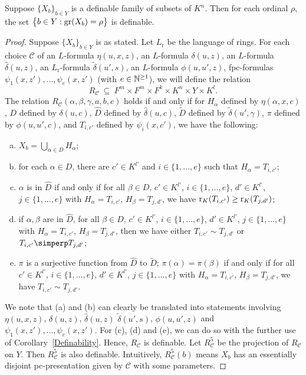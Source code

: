 \begin{thm}
Suppose $ \{ X_b\}_{b \in Y}$ is a definable family of subsets of $K^n$. Then for each ordinal \(\rho\), the set \( \big\{ b \in Y :  \mathrm{gr}(X_b)= \rho\big\} \) is definable.
\end{thm}

\begin{proof}
Suppose $ \{ X_b\}_{b \in Y}$ is as stated. Let $L_{\mathrm{r}}$ be the language of rings. For each choice $\mathscr{C}$ of an $L$-formula $\eta(u,x,z)$, an $L$-formula $\delta(u,z)$, an $L$-formula $\hat{\delta}(u,z)$,   an $L_{\mathrm{r}}$-formula $\tilde{\delta}(u',s)$,  an $L$-formula $\phi(u,u',z)$, fpc-formulas $\psi_1(x,z'), \ldots, \psi_e(x,z')$ (with $e \in \mathbb{N}^{\geq 1}$), we will define the relation 
$$R_{\mathscr{C}}\ \subseteq\ F^{m} \times  F^{m}\times F^{k} \times K^n \times Y \times K^{l} .$$
The relation $R_{\mathscr{C}}(\alpha, \beta, \gamma, a, b, c)$ holds if and only if for  $H_\alpha$ defined by $\eta(\alpha,x,c)$, $D$ defined by ${\delta}(u,c)$, $\hat{D}$ defined by $\hat{\delta}(u,c)$,  $\widetilde{D}$ defined by $\tilde{\delta}(u',\gamma)$, $\pi$ defined by $\phi(u,u',c)$, and  $T_{i,c'}$ defined by $\psi_i( x,c')$, we have the following:
\begin{enumerate}[(a)]
\item $X_b =\bigcup_{\alpha \in D} H_\alpha$;
\item for each  $\alpha \in D$,  there are $c' \in K^{l'}$ and $i \in \{1, \ldots, e \} $ such that $H_\alpha = T_{i,c'}$;
\item $\alpha$ is in $\hat{D}$ if and only if for all $\beta \in D$,  $c' \in K^{l'}$, $i \in \{1, \ldots, e \} $, $d' \in K^{l'}$, $j \in \{1, \ldots, e\} $ with  $H_\alpha = T_{i,c'}$, $H_\beta = T_{j,d'}$, we have $\mathrm{r}_K(T_{i,c'}) \geq \mathrm{r}_K(T_{j,d'})$;
\item if $\alpha, \beta$ are in $\hat{D}$, for all $\beta \in D$,  $c' \in K^{l'}$, $i \in \{1, \ldots, e \} $, $d' \in K^{l'}$, $j \in \{1, \ldots, e \} $ with  $H_\alpha = T_{i,c'}$, $H_\beta = T_{j,d'}$, then we have either $T_{i,c'} \sim T_{j,d'}$ or $T_{i,c'} \simperp T_{j,d'}$;
\item $\pi$ is a surjective function from $\hat{D}$ to $\widetilde{D}$; $\pi(\alpha) =\pi(\beta)$ if and only if for all $c' \in K^{l'}$, $i \in \{1, \ldots, e \} $, $d' \in K^{l'}$, $j \in \{1, \ldots, e \} $ with  $H_\alpha = T_{i,c'}$, $H_\beta = T_{j,d'}$, we have $T_{i,c'} \sim T_{j,d'}$.
\end{enumerate}
%
We note that (a) and (b) can clearly be translated into statements involving $\eta(u,x,z)$, $\delta(u,z)$, $\hat{\delta}(u,z)$  $\tilde{\delta}(u',s)$, $\phi(u,u',z)$ and $\psi_1(x,z'), \ldots, \psi_e(x,z')$. For (c), (d) and (e), we can do so with the further use of Corollary~\ref{Definability}. Hence, $R_{\mathscr{C}}$ is definable. Let $R^5_{\mathscr{C}}$ be the projection of $R_{\mathscr{C}}$ on $Y$. Then $R^5_{\mathscr{C}}$ is also definable. Intuitively, $R^5_{\mathscr{C}}(b)$ means $X_b$ has an essentially disjoint pc-presentation given by $\mathscr{C}$ with some parameters.


\end{proof}
